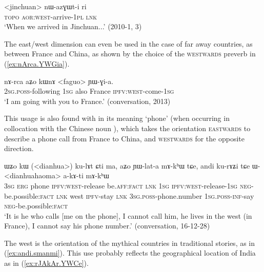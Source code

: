 \begin{exe}
\ex \label{ex:jinchuan.nazGWti}
\gll  <jinchuan> nɯ-azɣɯt-i ri \\
\textsc{topo} \textsc{aor}:\textsc{west}-arrive-\textsc{1pl} \textsc{lnk} \\
\glt `When we arrived in Jinchuan...' (2010-1, 3)
\end{exe}

The east/west dimension can even be used in the case of far away countries, as between France and China, as shown by the choice of the \textsc{westwards} preverb in (\ref{ex:nArca.YWGia}). 

\begin{exe}
\ex \label{ex:nArca.YWGia}
\gll nɤ-rca aʑo kɯnɤ <faguo> ɲɯ-ɣi-a. \\
\textsc{2sg}.\textsc{poss}-following \textsc{1sg} also France \textsc{ipfv}:\textsc{west}-come-\textsc{1sg} \\ 
\glt `I am going with you to France.' (conversation, 2013)
\end{exe}

This usage is also found with  in its meaning `phone' (when occurring in collocation with the Chinese noun ), which takes the orientation \textsc{eastwards} to describe a phone call from France to China, and \textsc{westwards} for the opposite direction.

\begin{exe}
\ex \label{ex:kulAt.YWlata}
\gll ɯʑo kɯ (<dianhua>) ku-lɤt ɕti ma, aʑo ɲɯ-lat-a mɤ-kʰɯ tɕe, andi ku-rɤʑi tɕe ɯ-<dianhuahaoma> a-kɤ-ti mɤ-kʰɯ \\
\textsc{3sg} \textsc{erg} phone \textsc{ipfv}:\textsc{west}-release be.\textsc{aff}:\textsc{fact} \textsc{lnk} \textsc{1sg} \textsc{ipfv}:\textsc{west}-release-\textsc{1sg} \textsc{neg}-be.possible:\textsc{fact} \textsc{lnk} west \textsc{ipfv}-stay \textsc{lnk} \textsc{3sg}.\textsc{poss}-phone.number \textsc{1sg}.\textsc{poss}-\textsc{inf}-say \textsc{neg}-be.possible:\textsc{fact} \\
\glt `It is he who calls [me on the phone], I cannot call him, he lives in the west (in France), I cannot say his phone number.' (conversation, 16-12-28)
\end{exe}

The west is the orientation of the mythical countries in traditional stories, as in (\ref{ex:andi.smanmi}). This use probably reflects the geographical location of India as in (\ref{ex:rJAkAr.YWCe}).

